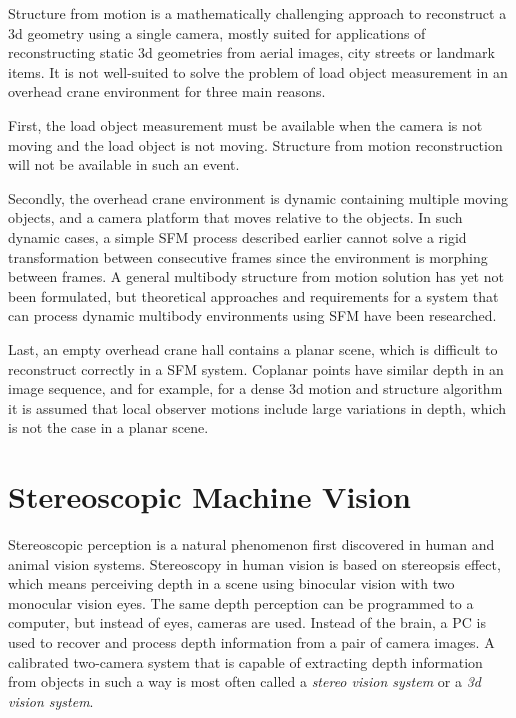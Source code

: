 \documentclass[12pt,a4paper,oneside,pdftex]{report}
\begin{document}
{Structure from motion is a mathematically challenging approach to reconstruct a 3d geometry using a single camera, mostly suited for applications of reconstructing static 3d geometries from aerial images, city streets or landmark items. It is not well-suited to solve the problem of load object measurement in an overhead crane environment for three main reasons.

First, the load object measurement must be available when the camera is not moving and the load object is not moving. Structure from motion reconstruction will not be available in such an event. 

Secondly, the overhead crane environment is dynamic containing multiple moving objects, and a camera platform that moves relative to the objects. In such dynamic cases, a simple SFM process described earlier cannot solve a rigid transformation between consecutive frames since the environment is morphing between frames. A general multibody structure from motion solution has yet not been formulated, but theoretical approaches and requirements for a system that can process dynamic multibody environments using SFM have been researched\citep{Ozden10}.

Last, an empty overhead crane hall contains a planar scene, which is difficult to reconstruct correctly in a SFM system. Coplanar points have similar depth in an image sequence, and for example, for a dense 3d motion and structure algorithm it is assumed that local observer motions include large variations in depth, which is not the case in a planar scene\citep{Trucco98}.

\chapter{Stereoscopic Machine Vision}
\label{chapter:stereoscopic_machine_vision}
Stereoscopic perception is a natural phenomenon first discovered in human and animal vision systems. Stereoscopy in human vision is based on stereopsis effect, which means perceiving depth in a scene using binocular vision with two monocular vision eyes. The same depth perception can be programmed to a computer, but instead of eyes, cameras are used. Instead of the brain, a PC is used to recover and process depth information from a pair of camera images. A calibrated two-camera system that is capable of extracting depth information from objects in such a way is most often called a \emph{stereo vision system} or a \emph{3d vision system}.

}
\end{document}
